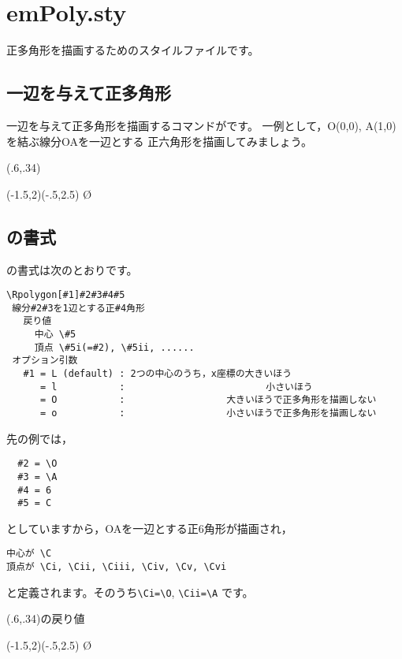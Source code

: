 \documentclass[a4j]{jarticle}
\begin{document}
\section{\textsf{emPoly.sty}}
正多角形を描画するためのスタイルファイルです。
\subsection{一辺を与えて正多角形}
一辺を与えて正多角形を描画するコマンドがです。
一例として，O\retu(0,0), A\retu(1,0)を結ぶ線分OAを一辺とする
正六角形を描画してみましょう。

\begin{showEx}(.6,.34){}
\begin{zahyou}[ul=10mm](-1.5,2)(-.5,2.5)
  \Rpolygon\O{}
\end{zahyou}
\end{showEx}

\subsection{の書式}

の書式は次のとおりです。

\begin{boxnote}
\begin{verbatim}
\Rpolygon[#1]#2#3#4#5
 線分#2#3を1辺とする正#4角形
   戻り値
     中心 \#5
     頂点 \#5i(=#2), \#5ii, ......
 オプション引数
   #1 = L (default) : 2つの中心のうち，x座標の大きいほう
      = l           :                         小さいほう
      = O           :                  大きいほうで正多角形を描画しない
      = o           :                  小さいほうで正多角形を描画しない
\end{verbatim}
\end{boxnote}

先の例では，
\begin{verbatim}
  #2 = \O
  #3 = \A
  #4 = 6
  #5 = C
\end{verbatim}
としていますから，OAを一辺とする正6角形が描画され，
\begin{jquote}
\begin{verbatim}
中心が \C
頂点が \Ci, \Cii, \Ciii, \Civ, \Cv, \Cvi
\end{verbatim}
\end{jquote}
と定義されます。そのうち\verb+\Ci=\O+, \verb+\Cii=\A+ です。

\begin{showEx}(.6,.34){の戻り値}
\begin{zahyou}[ul=10mm](-1.5,2)(-.5,2.5)
  \Rpolygon\O{}
  \Kuromaru\C
  \Put{}
  \Put{}
  \Put{}
  \Put{}
  \Put{}
\end{zahyou}
\end{showEx}
\end{document}
